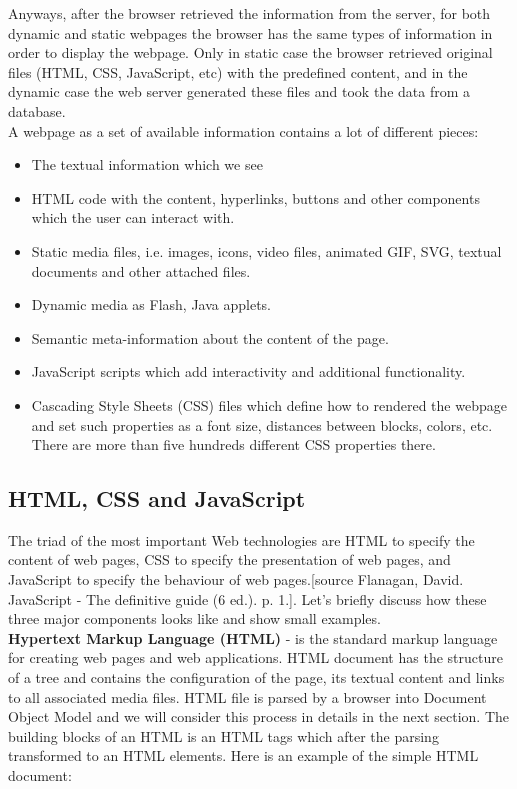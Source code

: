 Anyways, after the browser retrieved the information from the server, for both dynamic and static webpages the browser has the same types of information in order to display the webpage. Only in static case the browser retrieved original files (HTML, CSS, JavaScript, etc)  with the predefined content, and in the dynamic case the web server generated these files and took the data from a database.\\

A webpage as a set of available information contains a lot of different pieces:

\begin{itemize}
    \item The textual information which we see
    \item HTML code with the content, hyperlinks, buttons and other components which the user can interact with.
    \item Static media files, i.e. images, icons, video files, animated GIF, SVG, textual documents and other attached files.
    \item Dynamic media as Flash, Java applets.
    \item Semantic meta-information about the content of the page.
    \item JavaScript scripts which add interactivity and additional functionality.
    \item Cascading Style Sheets (CSS) files which define how to rendered the webpage and set such properties as a font size, distances between blocks, colors, etc. There are more than five hundreds different CSS properties there.
\end{itemize}

\subsection{HTML, CSS and JavaScript}
The triad of the most important Web technologies are HTML to specify the content of web pages, CSS to specify the presentation of web pages, and JavaScript to specify the behaviour of web pages.[source Flanagan, David. JavaScript - The definitive guide (6 ed.). p. 1.]. Let's briefly discuss how these three major components looks like and show small examples.\\
[source https://www.w3schools.com]

\noindent\textbf{Hypertext Markup Language (HTML)} - is the standard markup language for creating web pages and web applications. HTML document has the structure of a tree and contains the configuration of the page, its textual content and links to all associated media files. HTML file is parsed by a browser into Document Object Model and we will consider this process in details in the next section. The building blocks of an HTML is an HTML tags which after the parsing transformed to an HTML elements. Here is an example of the simple HTML document: \\

